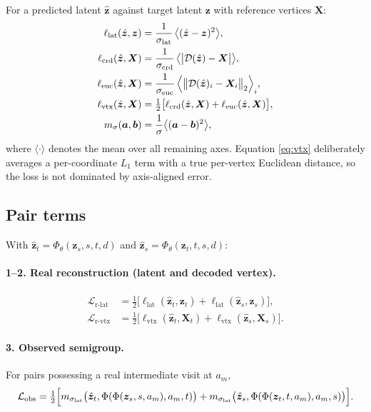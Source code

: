 \documentclass[11pt]{article}
\newcommand{\z}{\bm{z}}
\newcommand{\X}{\bm{X}}
\newcommand{\Loss}{\mathcal{L}}
\newcommand{\Dec}{\mathcal{D}}
\begin{document}
For a predicted latent $\hat{\z}$ against target latent $\z$ with reference vertices $\X$:
\begin{align}
  \ell_{\mathrm{lat}}(\hat{\z}, \z) &= \frac{1}{\sigma_{\mathrm{lat}}}\,
    \bigl\langle (\hat{\z} - \z)^2 \bigr\rangle, \\
  \ell_{\mathrm{crd}}(\hat{\z}, \X) &= \frac{1}{\sigma_{\mathrm{crd}}}\,
    \bigl\langle \bigl| \Dec(\hat{\z}) - \X \bigr| \bigr\rangle, \\
  \ell_{\mathrm{euc}}(\hat{\z}, \X) &= \frac{1}{\sigma_{\mathrm{euc}}}\,
    \Bigl\langle \bigl\| \Dec(\hat{\z})_i - \X_i \bigr\|_2 \Bigr\rangle_i, \\
  \ell_{\mathrm{vtx}}(\hat{\z}, \X) &= \tfrac{1}{2}\bigl[
    \ell_{\mathrm{crd}}(\hat{\z}, \X) + \ell_{\mathrm{euc}}(\hat{\z}, \X) \bigr],
    \label{eq:vtx}\\
  m_\sigma(\bm{a}, \bm{b}) &= \frac{1}{\sigma}\bigl\langle (\bm{a} - \bm{b})^2 \bigr\rangle,
\end{align}
where $\langle\cdot\rangle$ denotes the mean over all remaining axes. Equation
\eqref{eq:vtx} deliberately averages a per-coordinate $L_1$ term with a true per-vertex
Euclidean distance, so the loss is not dominated by axis-aligned error.

\subsection{Pair terms}

With $\hat{\z}_t = \Phi_\theta(\z_s, s, t, d)$ and $\hat{\z}_s = \Phi_\theta(\z_t, t, s, d)$:

\paragraph{1--2. Real reconstruction (latent and decoded vertex).}
\begin{align}
  \Loss_{\mathrm{r\text{-}lat}} &= \tfrac{1}{2}\bigl[
    \ell_{\mathrm{lat}}(\hat{\z}_t, \z_t) + \ell_{\mathrm{lat}}(\hat{\z}_s, \z_s) \bigr], \\
  \Loss_{\mathrm{r\text{-}vtx}} &= \tfrac{1}{2}\bigl[
    \ell_{\mathrm{vtx}}(\hat{\z}_t, \X_t) + \ell_{\mathrm{vtx}}(\hat{\z}_s, \X_s) \bigr].
\end{align}

\paragraph{3. Observed semigroup.} For pairs possessing a real intermediate visit at $a_m$,
\begin{equation}
  \Loss_{\mathrm{obs}} = \tfrac{1}{2}\Bigl[
    m_{\sigma_{\mathrm{lat}}}\bigl(\hat{\z}_t, \Phi(\Phi(\z_s,s,a_m),a_m,t)\bigr)
  + m_{\sigma_{\mathrm{lat}}}\bigl(\hat{\z}_s, \Phi(\Phi(\z_t,t,a_m),a_m,s)\bigr) \Bigr].
\end{equation}
\end{document}

